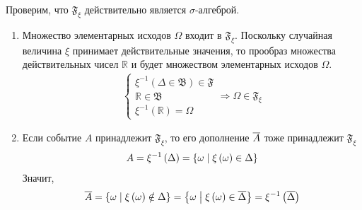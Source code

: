 Проверим, что $\mathfrak{F}_\xi$ действительно является $\sigma$-алгеброй.
\begin{enumerate}
  \item Множество элементарных исходов $\Omega$ входит в $\mathfrak{F}_\xi$.
      Поскольку случайная величина $\xi$ принимает действительные значения,
      то прообраз множества действительных чисел $\mathbb{R}$
      и будет множеством элементарных исходов $\Omega$.
      \begin{align*}
        \begin{cases}
          \xi^{-1}\left( \Delta \in \mathfrak{B} \right) \in \mathfrak{F} \\
          \mathbb{R} \in \mathfrak{B} \\
          \xi^{-1}\left( \mathbb{R} \right)= \Omega
        \end{cases}
        \Rightarrow
        \Omega \in \mathfrak{F}_\xi
      \end{align*}
  \item Если событие $A$ принадлежит $\mathfrak{F}_\xi$,
      то его дополнение $\overline{A}$ тоже принадлежит $\mathfrak{F}_\xi$
      \begin{align*}
        A
        = \xi^{-1}\left( \Delta \right)
        = \left\{ \omega \;\middle|\; \xi\left( \omega \right) \in \Delta \right\}
      \end{align*}
      Значит,
      \begin{align*}
        \overline{A}
        = \left\{ \omega \;\middle|\; \xi\left( \omega \right) \notin \Delta \right\}
        = \left\{ \omega \;\middle|\; \xi\left( \omega \right)
          \in \overline{\Delta}\right\}
        = \xi^{-1}\left( \overline{\Delta} \right)
      \end{align*}


\end{enumerate}
